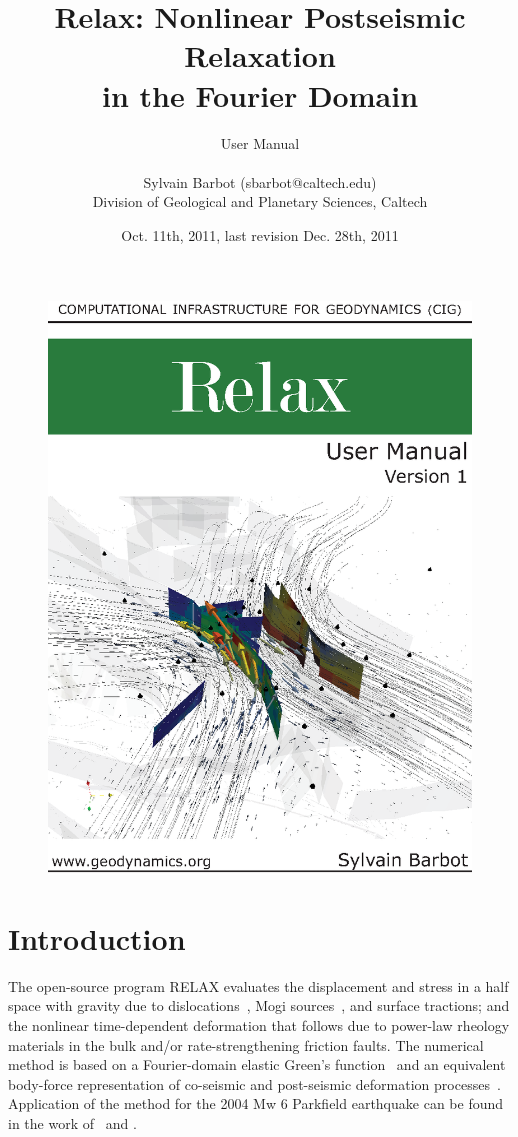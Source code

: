 \documentclass[10pt]{article}
\title{\bf Relax: Nonlinear Postseismic Relaxation\\in the Fourier Domain}
\author
{User Manual\\
\\
\normalsize{Sylvain Barbot (sbarbot@caltech.edu)}\\
\normalsize{Division of Geological and Planetary Sciences, Caltech}\\
}
\date{Oct. 11th, 2011, last revision Dec. 28th, 2011}
\begin{document}
 


\thispagestyle{empty}
\begin{figure}[!h]
\centering\includegraphics[width=15.092cm]{cover.eps}
\end{figure}
\pagebreak

\maketitle 


\vspace{1cm}


\pagestyle{fancy}
\cfoot{\thepage}

\section{Introduction}

The open-source program RELAX evaluates the displacement and stress in a half space with gravity due to dislocations~\citep[e.g.,][]{okada92}, Mogi sources~\citep{mogi58}, and surface tractions; and the nonlinear time-dependent deformation that follows due to power-law rheology materials in the bulk and/or rate-strengthening friction faults. The numerical method is based on a Fourier-domain elastic Green's function~\citep{barbot+09b,barbot&fialko10a} and an equivalent body-force representation of co-seismic and post-seismic deformation processes~\citep{barbot+09a,barbot&fialko10b}. Application of the method for the 2004 Mw 6 Parkfield earthquake can be found in the work of~\cite{barbot+09a} and \cite{bruhat+11}. 
\end{document}
